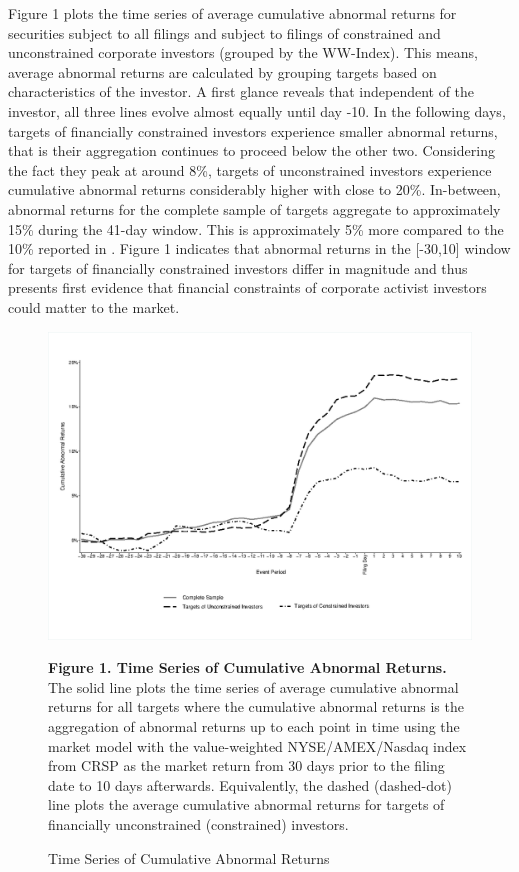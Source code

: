 \documentclass[12pt]{article}
\begin{document}
\noindent Figure 1 plots the time series of average cumulative abnormal returns for securities subject to all filings and subject to filings of constrained and unconstrained corporate investors (grouped by the WW-Index). This means, average abnormal returns are calculated by grouping targets based on characteristics of the investor. A first glance reveals that independent of the investor, all three lines evolve almost equally until day -10. In the following days, targets of financially constrained investors experience smaller abnormal returns, that is their aggregation continues to proceed below the other two. Considering the fact they peak at around 8\%, targets of unconstrained investors experience cumulative abnormal returns considerably higher with close to 20\%. In-between, abnormal returns for the complete sample of targets aggregate to approximately 15\% during the 41-day window. This is approximately 5\% more compared to the 10\% reported in \citet[p.1563]{Collin-Dufresne2015}. 
Figure 1 indicates that abnormal returns in the [-30,10] window for targets of financially constrained investors differ in magnitude and thus presents first evidence that financial constraints of corporate activist investors could matter to the market.
\begin{figure}[!htb]
	\centering
	\captionsetup{textformat=empty,labelformat=blank}
	\caption{Time Series of Cumulative Abnormal Returns}
	\begin{adjustbox}{width=\textwidth}
		\includegraphics{WW-TimeS_copy.eps} \label{AR}
	\end{adjustbox}
	\justifying
	\noindent\footnotesize{}\textbf{Figure 1. Time Series of Cumulative Abnormal Returns.} The solid line plots the time series of average cumulative abnormal returns for all targets where the cumulative abnormal returns is the aggregation of abnormal returns up to each point in time using the market model with the value-weighted NYSE/AMEX/Nasdaq index from CRSP as the market return from 30 days prior to the filing date to 10 days afterwards. Equivalently, the dashed (dashed-dot) line plots the average cumulative abnormal returns for targets of financially unconstrained (constrained) investors. \par\medskip
\end{figure}
\end{document}
